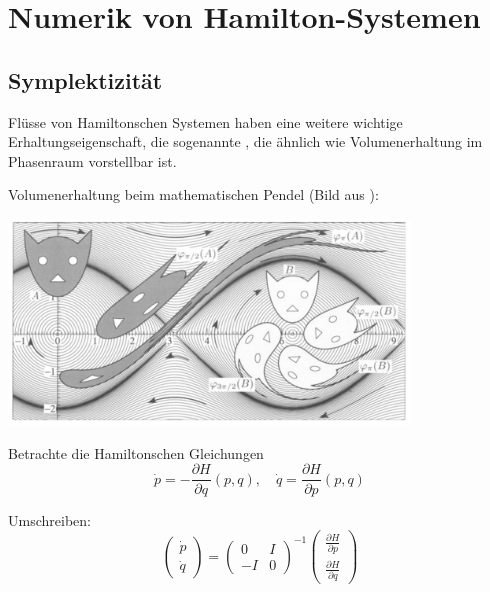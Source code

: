 \chapter{Numerik von Hamilton-Systemen}



\section{Symplektizität}

Flüsse von Hamiltonschen Systemen haben eine weitere wichtige Erhaltungseigenschaft, die sogenannte , die ähnlich wie Volumenerhaltung im Phasenraum vorstellbar ist.

\begin{bsp}
	Volumenerhaltung beim mathematischen Pendel (Bild aus \cite{hairer_lubich_wanner:2006}):
	\begin{center}
		\includegraphics[width=0.8\textwidth]{pendulum-symplecticity-cats}
	\end{center}
\end{bsp}



Betrachte die Hamiltonschen Gleichungen
\begin{equation*}
	\dot p = - \frac{\partial H}{\partial q}(p, q),
	\quad
	\dot q = \frac{\partial H}{\partial p}(p, q)
\end{equation*}

Umschreiben:
\begin{equation*}
	\begin{pmatrix} \dot p \\ \dot q \end{pmatrix}
	=
	\begin{pmatrix} 0 & I \\ -I & 0 \end{pmatrix}^{-1}
	\begin{pmatrix} \frac{\partial H}{\partial p} \\ \frac{\partial H}{\partial q} \end{pmatrix}
\end{equation*}

